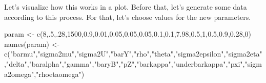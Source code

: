 \documentclass[
]{book}
\newenvironment{Shaded}{\begin{snugshade}}{\end{snugshade}}
\newcommand{\DecValTok}[1]{\textcolor[rgb]{0.00,0.00,0.81}{#1}}
\newcommand{\FloatTok}[1]{\textcolor[rgb]{0.00,0.00,0.81}{#1}}
\newcommand{\FunctionTok}[1]{\textcolor[rgb]{0.00,0.00,0.00}{#1}}
\newcommand{\NormalTok}[1]{#1}
\newcommand{\OtherTok}[1]{\textcolor[rgb]{0.56,0.35,0.01}{#1}}
\newcommand{\StringTok}[1]{\textcolor[rgb]{0.31,0.60,0.02}{#1}}
\theoremstyle{definition}
\theoremstyle{definition}
\theoremstyle{definition}
\theoremstyle{definition}
\theoremstyle{remark}
\begin{document}
Let's visualize how this works in a plot.
Before that, let's generate some data according to this process.
For that, let's choose values for the new parameters.

\begin{Shaded}
\begin{Highlighting}[]
\NormalTok{param }\OtherTok{\textless{}{-}} \FunctionTok{c}\NormalTok{(}\DecValTok{8}\NormalTok{,.}\DecValTok{5}\NormalTok{,.}\DecValTok{28}\NormalTok{,}\DecValTok{1500}\NormalTok{,}\FloatTok{0.9}\NormalTok{,}\FloatTok{0.01}\NormalTok{,}\FloatTok{0.05}\NormalTok{,}\FloatTok{0.05}\NormalTok{,}\FloatTok{0.05}\NormalTok{,}\FloatTok{0.1}\NormalTok{,}\FloatTok{0.1}\NormalTok{,}\FloatTok{7.98}\NormalTok{,}\FloatTok{0.5}\NormalTok{,}\DecValTok{1}\NormalTok{,}\FloatTok{0.5}\NormalTok{,}\FloatTok{0.9}\NormalTok{,}\FloatTok{0.28}\NormalTok{,}\DecValTok{0}\NormalTok{)}
\FunctionTok{names}\NormalTok{(param) }\OtherTok{\textless{}{-}} \FunctionTok{c}\NormalTok{(}\StringTok{"barmu"}\NormalTok{,}\StringTok{"sigma2mu"}\NormalTok{,}\StringTok{"sigma2U"}\NormalTok{,}\StringTok{"barY"}\NormalTok{,}\StringTok{"rho"}\NormalTok{,}\StringTok{"theta"}\NormalTok{,}\StringTok{"sigma2epsilon"}\NormalTok{,}\StringTok{"sigma2eta"}\NormalTok{,}\StringTok{"delta"}\NormalTok{,}\StringTok{"baralpha"}\NormalTok{,}\StringTok{"gamma"}\NormalTok{,}\StringTok{"baryB"}\NormalTok{,}\StringTok{"pZ"}\NormalTok{,}\StringTok{"barkappa"}\NormalTok{,}\StringTok{"underbarkappa"}\NormalTok{,}\StringTok{"pxi"}\NormalTok{,}\StringTok{"sigma2omega"}\NormalTok{,}\StringTok{"rhoetaomega"}\NormalTok{)}
\end{Highlighting}
\end{Shaded}
\end{document}
